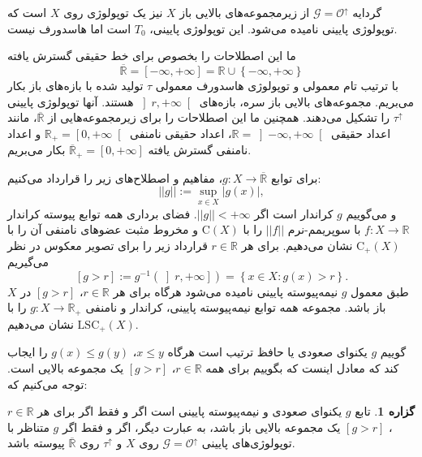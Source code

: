 \documentclass[12pt,a4paper]{article}
\theoremstyle{definition}
\theoremstyle{theorem}
\newtheorem{proposition}[definition]{گزاره}
\theoremstyle{definition}
\newcommand{\cO}{\mathcal{O}}
\newcommand{\cG}{\mathcal{G}}
\newcommand{\rC}{\mathrm{C}}
\begin{document}
 گردایه
$ \cG=\cO^{\uparrow} $
از زیرمجموعه‌های بالایی باز 
$ X $
نیز یک توپولوژی روی
$ X $
است که توپولوژی پایینی نامیده می‌شود. این توپولوژی پایینی، 
$ T_{0} $
است اما هاسدورف نیست.

ما این اصطلاحات را بخصوص برای خط حقیقی گسترش یافته
$$ \overline{\mathbb{R}} =[-\infty,+\infty]=\mathbb{R}\cup\left\lbrace -\infty,+\infty\right\rbrace $$
با ترتیب تام معمولی و توپولوژی هاسدورف معمولی 
$ \tau $
تولید شده با بازه‌های باز بکار می‌بریم. مجموعه‌های بالایی باز سره، بازه‌های 
$ \left] r,+\infty\right[  $
هستند. آنها توپولوژی پایینی 
$ \tau^{\uparrow} $
را تشکیل می‌دهند. همچنین ما این اصطلاحات را برای زیرمجموعه‌هایی از 
$ \overline{\mathbb{R}} $، مانند اعداد حقیقی
\mbox{$ \mathbb{R}=\left] -\infty,+\infty\right[  $}، اعداد حقیقی نامنفی
$ \mathbb{R}_{+}=\left[ 0,+\infty\right[  $ و اعداد نامنفی گسترش یافته
\mbox{$ \overline{\mathbb{R}}_{+}=[0,+\infty] $}
بکار می‌بریم.

برای توابع 
$ g:X\rightarrow \overline{\mathbb{R}}$، مفاهیم و اصطلاح‌های زیر را قرارداد می‌کنیم:
$$||g||:= \sup_{x \in X} |g(x)| ,$$
و می‌گوییم 
$ g $ 
کراندار است اگر
$ ||g|| < + \infty $. فضای برداری همه توابع پیوسته کراندار 
$ f:X\rightarrow \mathbb{R} $
با سوپریمم-نرم
$ ||f|| $
را با 
$ \rC(X) $\index{$ \rC(X) $}
و مخروط مثبت عضوهای نامنفی آن را با 
$ \rC_{+}(X) $\index{$ \rC_{+}(X) $}
نشان می‌دهیم. برای هر 
$ r\in \mathbb{R} $
قرارداد زیر را برای تصویر معکوس در نظر می‌گیریم
$$[g>r]:=g^{-1}  (\left]  r,+ \infty \right] )=\left\lbrace x \in X : g(x)>r \right\rbrace .$$
\index{$ [g>r] $}
طبق معمول 
$ g $
نیمه‌پیوسته پایینی
 نامیده می‌شود هرگاه برای هر
$ r\in \mathbb{R} $،   
$[g>r]  $
در
$ X $
باز باشد. مجموعه همه توابع نیمه‌پیوسته پایینی، کراندار و نامنفی 
$ g:X\rightarrow \mathbb{R}_{+} $
را با
$ \mathrm{LSC}_{+}(X) $
نشان می‌دهیم.

گوییم 
$ g $
یکنوای صعودی  یا حافظ ترتیب
 است هرگاه
$ x\leq y $،  
$ g(x)\leq g(y) $
را ایجاب کند که معادل اینست که بگوییم برای همه
$ r\in \mathbb{R} $،  
$[g>r]  $
یک مجموعه بالایی است. توجه می‌کنیم که:
\begin{proposition}
تابع
$ g $
یکنوای صعودی   و نیمه‌پیوسته پایینی است اگر و فقط اگر برای هر
$ r\in \mathbb{R} $،  
$[g>r]  $
یک مجموعه بالایی ‌باز باشد، به عبارت دیگر، اگر و فقط اگر 
$ g $
متناظر با توپولوژی‌های پایینی 
$ \cG=\cO^{\uparrow} $
روی
$ X $
و
$ \tau^{\uparrow} $
روی
 $\overline{\mathbb{R}}$
 پیوسته باشد. 

 \end{proposition}
  
\end{document}
